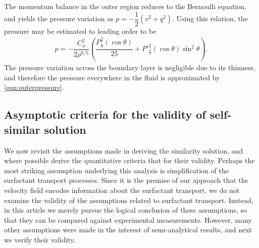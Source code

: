 \documentclass[]{jfm}
\begin{document}
The momentum balance in the outer region reduces to the Bernoulli equation, and yields the pressure variation as $p = -\dfrac{1}{2} ( v^2 + q^2)$.
Using this relation, the pressure may be estimated to leading order to be 
\begin{align}
 p = -\dfrac{C_\phi^2 }{2\rho^{8/5}} \left( \dfrac{P^2_{\frac{1}{5}} (\cos\theta) }{25} + P'^2_{\frac{1}{5}} (\cos\theta) \sin^2\theta \right).
 \label{eqn:outerpressure}
\end{align}
The pressure variation across the boundary layer is negligible due to its thinness, and therefore the pressure everywhere in the fluid is approximated by \eqref{eqn:outerpressure}.

\subsection{Asymptotic criteria for the validity of self-similar solution}
\label{subsec:validity}
We now revisit the assumptions made in deriving the similarity solution, and where possible derive the quantitative criteria that for their validity.
Perhaps the most striking assumption underlying this analysis is simplification of the surfactant transport processes. 
Since it is the premise of our approach that the velocity field encodes information about the surfactant transport, we do not examine the validity of the assumptions related to surfactant transport.
Instead, in this article we merely pursue the logical conclusion of these assumptions, so that they can be compared against experimental measurements. 
However, many other assumptions were made in the interest of semi-analytical results, and next we verify their validity.
\end{document}
